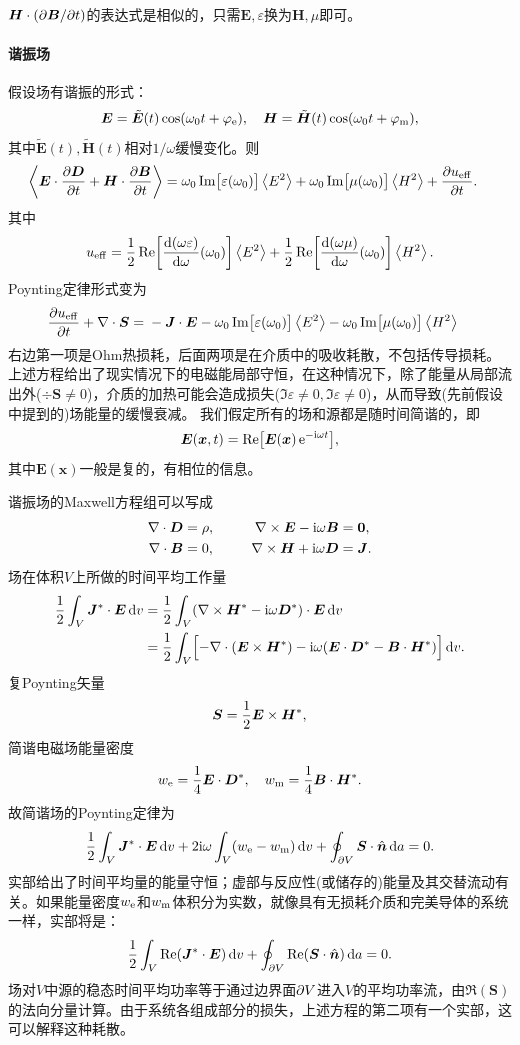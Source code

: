 $\bm H\cdot(\partial\bm B/\partial t)$的表达式是相似的，只需$\bm E,\varepsilon$换为$\bm H,\mu$即可。
\paragraph{谐振场}
假设场有谐振的形式： 
\[
    \bm E=\tilde{\bm E}(t)\cos(\omega_0t+\varphi_\mathrm e),\quad\bm H=\tilde{\bm H}(t)\cos(\omega_0t+\varphi_\text m),
\]
其中$\tilde{\bm E}(t),\tilde{\bm H}(t)$相对$1/\omega$缓慢变化。则
\begin{align*}
    \ave{\bm E\cdot\pv{\bm D}t+\bm H\cdot\pv{\bm B}t}={}&\omega_0\Im\bigfkh{\varepsilon(\omega_0)}\ave{E^2}+
    \omega_0\Im\bigfkh{\mu(\omega_0)}\ave{H^2}+\pv{u\eff}t.
\end{align*}
其中 
\[
    u\eff=\frac12\Re\biggfkh{\dv{(\omega\varepsilon)}\omega(\omega_0)}\ave{E^2}+\frac12\Re\biggfkh{\dv{(\omega\mu)}\omega(\omega_0)}\ave{H^2}.
\]
Poynting定律形式变为
\begin{align}
    \label{eqn:Poynting with loss}
    \frac{\partial^{\;\!\!}u_\mathrm{eff}}{\partial t^{\;\!\!}}+\nabla\cdot\bm S={}&-\bm J\cdot\bm E-\omega_0\operatorname{Im}\bigl[\varepsilon(\omega_0)\bigr]\left\langle E^2\right\rangle-\omega_0\operatorname{Im}\bigl[\mu(\omega_0)\bigr]\left\langle H^2\right\rangle
\end{align}
右边第一项是Ohm热损耗，后面两项是在介质中的吸收耗散，不包括传导损耗。
上述方程给出了现实情况下的电磁能局部守恒，在这种情况下，除了能量从局部流出外($\div\bm S\neq 0$)，介质的加热可能会造成损失($\Im\varepsilon\neq 0,\Im\varepsilon\neq 0$)，从而导致(先前假设中提到的)场能量的缓慢衰减。
我们假定所有的场和源都是随时间简谐的，即 
\[
    \bm E(\bm x,t)=\operatorname{Re}\bigl[\bm E(\bm x)\mathop{}\!\mathrm{e}^{-\mathrm{i}\omega t}\bigr],
\]
其中$\bm E(\bm x)$一般是复的，有相位的信息。

谐振场的Maxwell方程组可以写成
\begin{alignat*}{2}
    \nabla\cdot\bm D&=\rho,&\qquad\nabla\times\bm E-\mathrm{i}\omega\bm B&=\bm 0,\\
    \nabla\cdot\bm B&=0,&\nabla\times\bm H+\mathrm{i}\omega\bm D&=\bm J.  
\end{alignat*}
场在体积$V$上所做的时间平均工作量
\begin{align*}
    \frac12\int_V\bm J^\ast\cdot\bm E\mathop{}\!\mathrm{d} v&=\frac12\int_V(\nabla\times\bm H^\ast-\mathrm{i}\omega\bm D^\ast)\cdot\bm E\mathop{}\!\mathrm{d} v\\
    &=\frac12\int_V\Bigl[-\nabla\cdot(\bm E\times\bm H^\ast)-\mathrm{i}\omega(\bm E\cdot\bm D^\ast-\bm B\cdot\bm H^\ast)\Bigr]\mathop{}\!\mathrm{d} v.
\end{align*}
复Poynting矢量
\[
    \bm S=\frac12\bm E\times\bm H^\ast,
\]
简谐电磁场能量密度
\[
    w_\mathrm e=\frac14\bm E\cdot\bm D^\ast,\quad w_\text m=\frac14\bm B\cdot\bm H^\ast.
\]
故简谐场的Poynting定律为
\[
    \frac12\int_V\bm J^\ast\cdot\bm E\mathop{}\!\mathrm{d} v+2\mathrm{i}\omega\int_V(w_\mathrm e-w_\text m)\mathop{}\!\mathrm{d} v+\oint_{\partial V}\bm S\cdot\mathop{}\!\hat{\bm n}\mathop{}\!\mathrm{d} a=0.
\]
实部给出了时间平均量的能量守恒；虚部与反应性(或储存的)能量及其交替流动有关。如果能量密度$w_\mathrm e$和$w_\text m$体积分为实数，就像具有无损耗介质和完美导体的系统一样，实部将是：
\[
    \frac12\int_V\operatorname{Re}(\bm J^\ast\cdot\bm E)\mathop{}\!\mathrm{d} v+\oint_{\partial V}\operatorname{Re}(\bm S\cdot\mathop{}\!\hat{\bm n})\mathop{}\!\mathrm{d} a=0.
\]
场对$V$中源的稳态时间平均功率等于通过边界面$\partial V$进入$V$的平均功率流，由$\Re(\bm S)$的法向分量计算。由于系统各组成部分的损失，上述方程的第二项有一个实部，这可以解释这种耗散。
